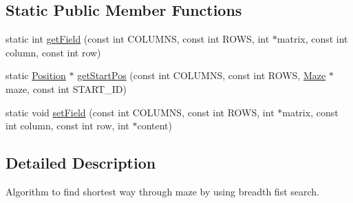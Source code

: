 \subsection*{Static Public Member Functions}
\begin{DoxyCompactItemize}
\item 
static int \hyperlink{class_breadth_first_search_a1e5271b5561e4fe52b7e67917f72511e}{get\-Field} (const int C\-O\-L\-U\-M\-N\-S, const int R\-O\-W\-S, int $\ast$matrix, const int column, const int row)
\item 
static \hyperlink{class_position}{Position} $\ast$ \hyperlink{class_breadth_first_search_a533670621ed3c1e3bfba89d667dab4c3}{get\-Start\-Pos} (const int C\-O\-L\-U\-M\-N\-S, const int R\-O\-W\-S, \hyperlink{class_maze}{Maze} $\ast$maze, const int S\-T\-A\-R\-T\-\_\-\-I\-D)
\item 
static void \hyperlink{class_breadth_first_search_a29e052c3dd62782fabc59a68ef27cade}{set\-Field} (const int C\-O\-L\-U\-M\-N\-S, const int R\-O\-W\-S, int $\ast$matrix, const int column, const int row, int $\ast$content)
\end{DoxyCompactItemize}


\subsection{Detailed Description}
Algorithm to find shortest way through maze by using breadth fist search. 

